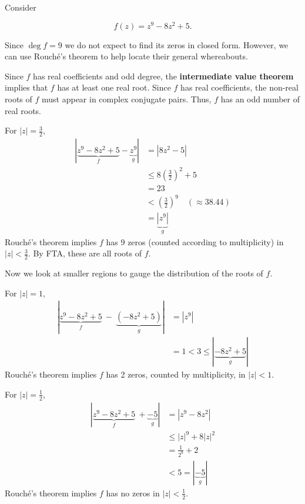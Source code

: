 \documentclass[12pt]{article}
\begin{document}
\eg Consider

$$f(z)=z^{9}-8z^{2}+5.$$

Since $\deg f=9$ we do not expect to find its zeros in closed form. 
However, we can use Rouch\'e's theorem to help locate their general whereabouts.

Since $f$ has real coefficients and odd degree, the \textbf{intermediate value theorem} implies that $f$ has at least one real root. Since $f$ has real coefficients, the non-real roots of $f$ must appear in complex conjugate pairs. Thus, $f$ has an odd number of real roots.

For $|z|=\frac{3}{2}$, \begin{align*}
    |\underbrace{z^{9}-8z^{2}+5}_{f}-\underbrace{z^{9}}_{g}|&=|8z^{2}-5|\\
    &\leq8(\tfrac{3}{2})^{2}+5\\
    &=23\\
    &<(\tfrac{3}{2})^{9}\quad(\approx38.44)\\
    &=\underbrace{|z^9|}_{g}
\end{align*}
Rouch\'e's theorem implies $f$ has 9 zeros (counted according to multiplicity) in $|z|<\frac{3}{2}$. By FTA, these are all roots of $f$.

Now we look at smaller regions to gauge the distribution of the roots of $f$.

For $|z|=1$, \begin{align*}
    |\underbrace{z^{9}-8z^{2}+5}_{f}\ -\ \underbrace{(-8z^{2}+5)}_{g}|&=|z^{9}|\\
    &=1<3\leq |\underbrace{-8z^{2}+5}_{g}|
\end{align*}
Rouch\'e's theorem implies $f$ has 2 zeros, counted by multiplicity, in $|z|<1$.

For $|z|=\frac{1}{2}$,\begin{align*}
    |\underbrace{z^{9}-8z^{2}+5}_{f}\ +\underbrace{-5}_{g}|&=|z^{9}-8z^{2}|\\
    &\leq|z|^{9}+8|z|^{2}\\
    &=\frac{1}{2^{9}}+2\\
    &<5=|\underbrace{-5}_{g}|
\end{align*}
Rouch\'e's theorem implies $f$ has no zeros in $|z|<\frac{1}{2}$.
\end{document}
